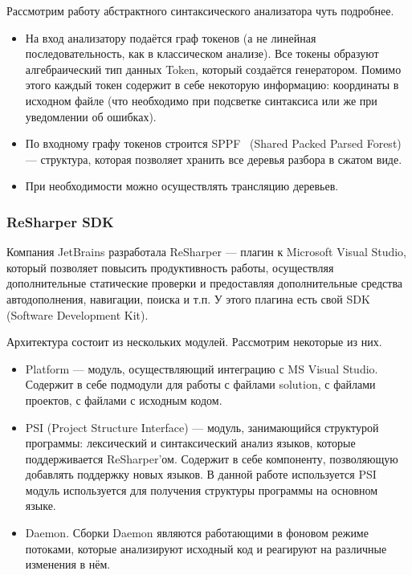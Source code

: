 Рассмотрим работу абстрактного синтаксического анализатора чуть подробнее. 
\begin{itemize}
\item
{
На вход анализатору подаётся граф токенов (а не линейная последовательность, как в классическом анализе). Все токены образуют алгебраический тип данных Token, который создаётся генератором. Помимо этого каждый токен содержит в себе некоторую информацию: координаты в исходном файле (что необходимо при подсветке синтаксиса или же при уведомлении об ошибках).
}
\item
{По входному графу токенов строится SPPF~\cite{RNGLR} (Shared Packed Parsed Forest) --- структура, которая позволяет хранить все деревья разбора в сжатом виде. 
}
\item При необходимости можно осуществлять трансляцию деревьев. 
\end{itemize}

\subsubsection{ReSharper SDK}

Компания JetBrains разработала ReSharper --- плагин к Microsoft Visual Studio, который позволяет повысить продуктивность работы, осуществляя дополнительные статические проверки и предоставляя дополнительные средства автодополнения, навигации, поиска и т.п.
У этого плагина есть свой SDK (Software Development Kit).  

Архитектура состоит из нескольких модулей. Рассмотрим некоторые из них.
\begin{itemize}
\item Platform --- модуль, осуществляющий интеграцию с MS Visual Studio. Содержит в себе подмодули для работы с файлами solution, с файлами проектов, с файлами с исходным кодом. 

\item PSI (Project Structure Interface) --- модуль, занимающийся структурой программы: лексический и синтаксический анализ языков, которые поддерживается ReSharper’ом. Содержит в себе компоненту, позволяющую добавлять поддержку новых языков. В данной работе используется PSI модуль используется для получения структуры программы на основном языке.

\item Daemon. Сборки Daemon являются работающими в фоновом режиме потоками, которые анализируют исходный код и реагируют на различные изменения в нём. 
	
\end{itemize}

